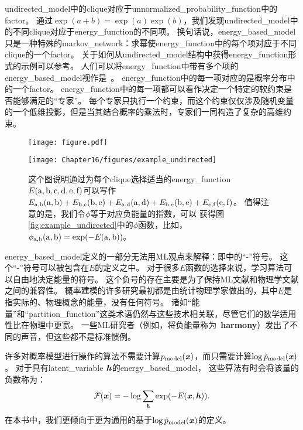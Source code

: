 \gls{undirected_model}中的\gls{clique}对应于\gls{unnormalized_probability_function}中的\gls{factor}。 
通过$\exp(a+b) = \exp(a) \exp(b)$，我们发现\gls{undirected_model}中的不同\gls{clique}对应于\gls{energy_function}的不同项。
换句话说，\gls{energy_based_model}只是一种特殊的\gls{markov_network}：求幂使\gls{energy_function}中的每个项对应于不同\gls{clique}的一个\gls{factor}。
关于如何从\gls{undirected_model}结构中获得\gls{energy_function}形式的示例可以参考。
人们可以将\gls{energy_function}中带有多个项的\gls{energy_based_model}视作是~\citep{Hinton99}。
\gls{energy_function}中的每一项对应的是概率分布中的一个\gls{factor}。
\gls{energy_function}中的每一项都可以看作决定一个特定的软约束是否能够满足的``专家''。
每个专家只执行一个约束，而这个约束仅仅涉及随机变量的一个低维投影，但是当其结合概率的乘法时，专家们一同构造了复杂的高维约束。



\begin{figure}[!htb]
\ifOpenSource
\centerline{\texttt{[image: figure.pdf]}}
\else
	\centerline{\texttt{[image: Chapter16/figures/example\_undirected]}}
\fi
\caption{这个图说明通过为每个\gls{clique}选择适当的\gls{energy_function} $E(\mathrm{a},\mathrm{b},\mathrm{c},\mathrm{d},\mathrm{e},\mathrm{f})$可以写作$E_{\mathrm{a},\mathrm{b}}(\mathrm{a},\mathrm{b}) + E_{\mathrm{b},\mathrm{c}}(\mathrm{b},\mathrm{c}) + E_{\mathrm{a},\mathrm{d}}(\mathrm{a},\mathrm{d})+  E_{\mathrm{b},\mathrm{e}}(\mathrm{b},\mathrm{e}) + E_{\mathrm{e},\mathrm{f}}(\mathrm{e},\mathrm{f})$。
值得注意的是，我们令$\phi$等于对应负能量的指数，可以
获得图\ref{fig:example_undirected}中的$\phi$函数，比如，$\phi_{\mathrm{a},\mathrm{b}}(\mathrm{a},\mathrm{b}) = \exp(-E(\mathrm{a},\mathrm{b}))$。}
	\label{fig:example_undirected_2}
\end{figure}


\gls{energy_based_model}定义的一部分无法用\gls{ML}观点来解释：即中的``-''符号。
这个``-''符号可以被包含在$E$的定义之中。
对于很多$E$函数的选择来说，学习算法可以自由地决定能量的符号。
这个负号的存在主要是为了保持\gls{ML}文献和物理学文献之间的兼容性。
概率建模的许多研究最初都是由统计物理学家做出的，其中$E$是指实际的、物理概念的能量，没有任何符号。
诸如``能量''和``\gls{partition_function}''这类术语仍然与这些技术相关联，尽管它们的数学适用性比在物理中更宽。
一些\gls{ML}研究者（例如，\citet{Smolensky86}将负能量称为~\textbf{harmony}）发出了不同的声音，但这些都不是标准惯例。


许多对概率模型进行操作的算法不需要计算$p_{\text{model}}(\boldsymbol{\mathit{x}})$，而只需要计算$\log \tilde{p}_{\text{model}}(\boldsymbol{\mathit{x}})$。
对于具有\gls{latent_variable} $\boldsymbol{\mathit{h}}$的\gls{energy_based_model}， 这些算法有时会将该量的负数称为：
\begin{align}
\label{eqn:168}
\mathcal{F} (\boldsymbol{\mathit{x}}) = -\log \sum_{\boldsymbol{\mathit{h}}} \exp(-E(\boldsymbol{\mathit{x}},\boldsymbol{\mathit{h}})).
\end{align}
在本书中，我们更倾向于更为通用的基于$\log \tilde{p}_{\text{model}}(\boldsymbol{\mathit{x}})$的定义。


